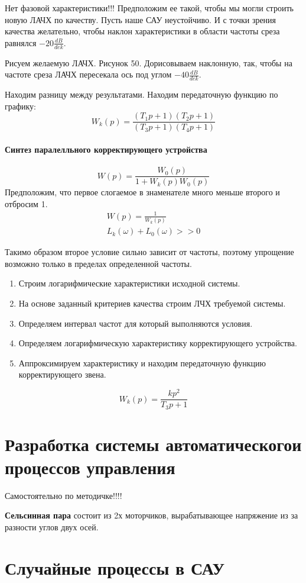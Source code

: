 Нет фазовой характеристики!!! Предположим ее такой, чтобы мы могли строить новую ЛАЧХ по качеству. Пусть наше САУ неустойчиво. И с точки зрения качества желательно, чтобы наклон характеристики в области частоты среза равнялся $-20\frac{dB}{dek}$.

Рисуем желаемую ЛАЧХ. Рисунок 50. Дорисовываем наклонную, так, чтобы на частоте среза ЛАЧХ пересекала ось под углом $-40\frac{dB}{dek}$. 

Находим разницу между результатами. Находим передаточную функцию по графику:
$$
	W_k(p)=\frac{(T_1p+1)(T_2p+1)}{(T_3p+1)(T_4p+1)}
$$
\paragraph{Синтез паралелльного корректирующего устройства}
$$
	W(p)=\frac{W_0(p)}{1+W_k(p)W_0(p)}
$$
Предположим, что первое слогаемое в знаменателе много меньше второго и отбросим 1.
\begin{align*}
	W(p)=\frac1{W_k(p)} \\
	L_k(\omega)+L_0(\omega)>>0
\end{align*}

Такимо образом второе условие сильно зависит от частоты, поэтому упрощение возможно только в пределах определенной частоты.
\begin{enumerate}
	\item Строим логарифмические характеристики исходной системы.
	\item На основе заданный критериев качества строим ЛЧХ требуемой системы.
	\item Определяем интервал частот для который выполняются условия.
	\item Определяем логарифмическую характеристику корректирующего устройства.
	\item Аппроксимируем характеристику и находим передаточную функцию корректирующего звена.
\end{enumerate}
$$
	W_k(p)=\frac{kp^2}{T_3p+1}
$$
\section{Разработка системы автоматическогои процессов управления}
Самостоятельно по методичке!!!!

\textbf{Сельсинная пара} состоит из 2х моторчиков, вырабатывающее напряжение из за разности углов двух осей.
\section{Случайные процессы в САУ}
